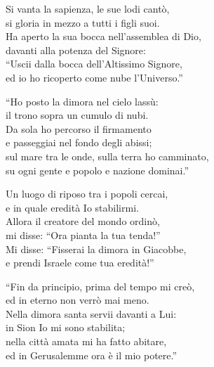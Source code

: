
\strofa Si vanta la sapienza, le sue lodi cantò,\\
si gloria in mezzo a tutti i figli suoi.\\
Ha aperto la sua bocca nell'assemblea di Dio,\\
davanti alla potenza del Signore:\\
``Uscii dalla bocca dell'Altissimo Signore,\\
ed io ho ricoperto come nube l'Universo.''

\spazio


\spazio

\strofa ``Ho posto la dimora nel cielo lassù:\\
il trono sopra un cumulo di nubi.\\
Da sola ho percorso il firmamento\\
e passeggiai nel fondo degli abissi;\\
sul mare tra le onde, sulla terra ho camminato,\\
su ogni gente e popolo e nazione dominai.''

\spazio


\spazio

\strofa Un luogo di riposo tra i popoli cercai,\\
e in quale eredità Io stabilirmi.\\
Allora il creatore del mondo ordinò,\\
mi disse: ``Ora pianta la tua tenda!''\\
Mi disse: ``Fisserai la dimora in Giacobbe,\\
e prendi Israele come tua eredità!''

\spazio


\spazio

\strofa ``Fin da principio, prima del tempo mi creò,\\
ed in eterno non verrò mai meno.\\
Nella dimora santa servii davanti a Lui:\\
in Sion Io mi sono stabilita;\\
nella città amata mi ha fatto abitare,\\
ed in Gerusalemme ora è il mio potere.''

